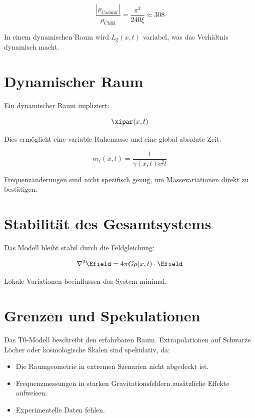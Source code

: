\begin{equation}
	\frac{|\rho_{\text{Casimir}}|}{\rho_{\text{CMB}}} = \frac{\pi^2}{240 \xi} \approx 308
	\label{eq:casimir_cmb_verhaeltnis}
\end{equation}

In einem dynamischen Raum wird \(L_\xi(x,t)\) variabel, was das Verhältnis dynamisch macht.

\section{Dynamischer Raum}
\label{sec:dynamischer_raum}

Ein dynamischer Raum impliziert:

\begin{equation}
	\xipar(x,t)
	\label{eq:xi_dynamisch}
\end{equation}

Dies ermöglicht eine variable Ruhemasse und eine global absolute Zeit:

\begin{equation}
	m_i(x,t) = \frac{1}{\gamma(x,t) c^2 t}
	\label{eq:masse_zeit_relation}
\end{equation}

Frequenzänderungen sind nicht spezifisch genug, um Massevariationen direkt zu bestätigen.

\section{Stabilität des Gesamtsystems}
\label{sec:stabilitaet}

Das Modell bleibt stabil durch die Feldgleichung:

\begin{equation}
	\nabla^2 \Efield = 4\pi G \rho(x,t) \cdot \Efield
	\label{eq:feldgleichung}
\end{equation}

Lokale Variationen beeinflussen das System minimal.

\section{Grenzen und Spekulationen}
\label{sec:grenzen}

Das T0-Modell beschreibt den erfahrbaren Raum. Extrapolationen auf Schwarze Löcher oder kosmologische Skalen sind spekulativ, da:

\begin{itemize}
	\item Die Raumgeometrie in extremen Szenarien nicht abgedeckt ist.
	\item Frequenzmessungen in starken Gravitationsfeldern zusätzliche Effekte aufweisen.
	\item Experimentelle Daten fehlen.
\end{itemize}

